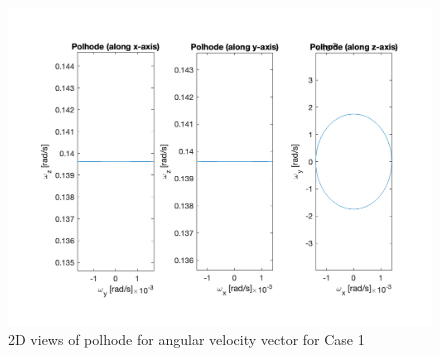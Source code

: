 \begin{figure}[H]
\centering
\includegraphics[scale=0.6]{Images/ps2_problem9_p8_z.png}
\caption{2D views of polhode for angular velocity vector for Case 1}
\label{fig:ps2_problem9_p8_z}
\end{figure}